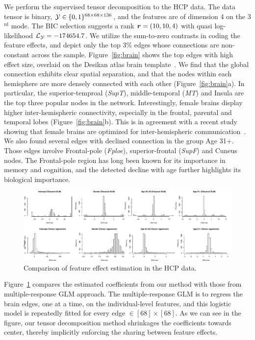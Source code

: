 \documentclass[12pt]{article}
\theoremstyle{definition}
\theoremstyle{definition}
\begin{document}
We perform the supervised tensor decomposition to the HCP data. The data tensor is binary, $\mathcal{Y}\in\{0,1\}^{68\times 68\times 136}$, and the features are of dimension 4 on the 3$^{\text{rd}}$ mode. The BIC selection suggests a rank $\bm{r}=(10,10,4)$ with quasi log-likelihood $\mathcal{L}_{\mathcal{Y}}=-174654.7$. We utilize the sum-to-zero contrasts in coding the feature effects, and depict only the top 3\% edges whose connections are non-constant across the sample. Figure~\ref{fig:brain} shows the top edges with high effect size, overlaid on the Desikan atlas brain template~\citep{desikan2006automated,xia2013brainnet}. We find that the global connection exhibits clear spatial separation, and that the nodes within each hemisphere are more densely connected with each other (Figure~\ref{fig:brain}a). In particular, the superior-temproal (\emph{SupT}), middle-temporal (\emph{MT}) and Insula are the top three popular nodes in the network. Interestingly, female brains display higher inter-hemispheric connectivity, especially in the frontal, parental and temporal lobes (Figure~\ref{fig:brain}b). This is in agreement with a recent study showing that female brains are optimized for inter-hemispheric communication~\citep{ingalhalikar2014sex}. We also found several edges with declined connection in the group Age 31+. Those edges involve Frontal-pole (\emph{Fploe}), superior-frontal (\emph{SupF}) and Cuneus nodes. The Frontal-pole region has long been known for its importance in memory and cognition, and the detected decline with age further highlights its biological importance. 

\begin{figure}[!h]
\centering
\includegraphics[width=16cm]{compare_HCP.pdf}
\caption{Comparison of feature effect estimation in the HCP data.}\label{fig:s1}
\end{figure}

Figure~\ref{fig:s1} compares the estimated coefficients from our method with those from multiple-response GLM approach. The multiple-response GLM is to regress the brain edges, one at a time, on the individual-level features, and this logistic model is repeatedly fitted for every edge $\in [68]\times [68]$. As we can see in the figure, our tensor decomposition method shrinkages the coefficients towards center, thereby implicitly enforcing the sharing between feature effects. 
\end{document}
